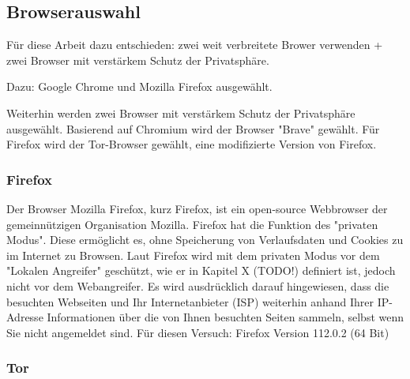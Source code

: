 \subsection{Browserauswahl}

Für diese Arbeit dazu entschieden: zwei weit verbreitete Brower verwenden + zwei Browser mit verstärkem Schutz der Privatsphäre.

Dazu: Google Chrome und Mozilla Firefox ausgewählt.

Weiterhin werden zwei Browser mit verstärkem Schutz der Privatsphäre ausgewählt.
Basierend auf Chromium wird der Browser "Brave" gewählt.
Für Firefox wird der Tor-Browser gewählt, eine modifizierte Version von Firefox.

\subsubsection*{Firefox}

Der Browser Mozilla Firefox, kurz Firefox, ist ein open-source Webbrowser der gemeinnützigen Organisation Mozilla. 
Firefox hat die Funktion des "privaten Modus". Diese ermöglicht es, ohne Speicherung von Verlaufsdaten und Cookies zu im Internet zu Browsen.
Laut Firefox wird mit dem privaten Modus vor dem "Lokalen Angreifer" geschützt, wie er in Kapitel X (TODO!) definiert ist, jedoch nicht vor dem Webangreifer.
Es wird ausdrücklich darauf hingewiesen, dass die besuchten Webseiten und Ihr Internetanbieter (ISP)  weiterhin anhand Ihrer IP-Adresse Informationen über die von Ihnen besuchten Seiten sammeln, selbst wenn Sie nicht angemeldet sind. 
Für diesen Versuch: Firefox Version 112.0.2 (64 Bit)

\subsubsection*{Tor}

